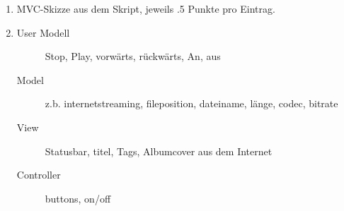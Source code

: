 
\begin{enumerate}
\item MVC-Skizze aus dem Skript, jeweils .5 Punkte pro Eintrag.

\item 
\begin{description} 
\item[User Modell] Stop, Play, vorwärts, rückwärts, An, aus
\item[Model] z.b. internetstreaming, fileposition, dateiname, länge, codec,
bitrate
\item[View] Statusbar, titel, Tags, Albumcover aus dem Internet 
\item[Controller] buttons, on/off
\end{description}

\end{enumerate}
